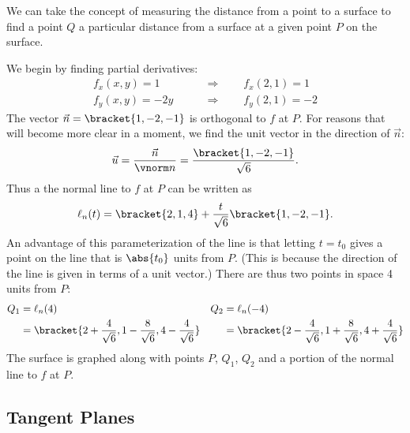 We can take the concept of measuring the distance from a point to a surface to find a point $Q$ a particular distance from a surface at a given point $P$ on the surface.

{We begin by finding partial derivatives:
\begin{align*}
f_x(x,y)  =1  \qquad &\Rightarrow \qquad f_x(2,1) = 1\\
f_y(x,y) = -2y \qquad &\Rightarrow \qquad  f_y(2,1) = -2
\end{align*}
The vector $\vec n=\bracket{1,-2,-1}$ is orthogonal to $f$ at $P$. For reasons that will become more clear in a moment, we find the unit vector in the direction of $\vec n$:
\[\vec u = \frac{\vec n}{\vnorm n}=\frac{\bracket{1,-2,-1}}{\sqrt6} %
.\]
Thus a the normal line to $f$ at $P$ can be written as
\[\ell_n(t) =\bracket{2,1,4}+\frac t{\sqrt6}\bracket{1,-2,-1}%
.\]
An advantage of this parameterization of the line is that letting $t=t_0$ gives a point on the line that is $\abs{t_0}$ units from $P$. (This is because the direction of the line is given in terms of a unit vector.) There are thus two points in space 4 units from $P$:
%
%
%
\begin{align*}
Q_1 &= \ell_n(4) & Q_2 &= \ell_n(-4) \\
  &=\bracket{2+\frac4{\sqrt6},1-\frac8{\sqrt6},4-\frac4{\sqrt6}}
  & & =\bracket{2-\frac4{\sqrt6},1+\frac8{\sqrt6},4+\frac4{\sqrt6}}
\end{align*}
The surface is graphed along with points $P$, $Q_1$, $Q_2$ and a portion of the normal line to $f$ at $P$.}

\subsection{Tangent Planes}

